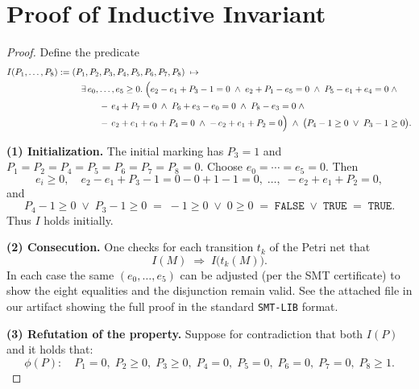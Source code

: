 
\section{Proof of Inductive Invariant}
\label{appendix:InductiveInvariantExample}


\begin{proof}
	
Define the predicate
\[
\begin{aligned}
	I(P_{1},\dots,P_{8})
	:={}&
		(P_{1},\textcolor{black}{P_{2}},\textcolor{black}{P_{3}},P_{4},P_{5},P_{6},\textcolor{black}{P_{7}},\textcolor{black}{P_{8}})
		\;\mapsto\;\\
		&\quad
		\exists\,e_{0},\dots,e_{5}\ge0.\;
		\Bigl(
		e_{2}-e_{1}+\textcolor{black}{P_{3}}-1=0\;\land\;
		e_{2}+P_{1}-e_{5}=0\;\land\;
		P_{5}-e_{1}+e_{4}=0\;\land\\
		&\qquad\quad
		-\,e_{4}+\textcolor{black}{P_{7}}=0\;\land\;
		P_{6}+e_{3}-e_{0}=0\;\land\;
		\textcolor{black}{P_{8}}-e_{3}=0\;\land\\
		&\qquad\quad
		-\,e_{2}+e_{1}+e_{0}+P_{4}=0\;\land\;
		-\,e_{2}+e_{1}+\textcolor{black}{P_{2}}=0
		\Bigr)
		\;\land\;
		\bigl(P_{4}-1\ge0\;\lor\;\textcolor{black}{P_{3}}-1\ge0\bigr).
	\end{aligned}
	\]
	
	
	\medskip\noindent
	\textbf{(1) Initialization.}
	The initial marking has $P_{3}=1$ and $P_{1}=P_{2}=P_{4}=P_{5}=P_{6}=P_{7}=P_{8}=0$.
	Choose $e_{0}=\cdots=e_{5}=0$.  Then
	\[
	e_{i}\ge0,\quad
	e_{2}-e_{1}+P_{3}-1=0-0+1-1=0,\;\dots,\;-e_{2}+e_{1}+P_{2}=0,
	\]
	and 
	\[
	P_{4}-1\ge0\;\lor\;P_{3}-1\ge0
	\;=\;-1\ge0\;\lor\;0\ge0
	\;=\;\texttt{FALSE}\;\lor\;\texttt{TRUE}
	\;=\;\texttt{TRUE}.
	\]
	Thus $I$ holds initially.
	
	\medskip\noindent
	\textbf{(2) Consecution.}
	One checks for each transition $t_{k}$ of the Petri net that
	\[
	I(M)\;\Longrightarrow\;I\bigl(t_{k}(M)\bigr).
	\]
	In each case the same $(e_{0},\dots,e_{5})$ can be adjusted (per the SMT certificate) to show the eight equalities and the disjunction remain valid. See the attached file in our artifact showing the full proof in the standard \texttt{SMT-LIB} format.
	
	\medskip\noindent
	\textbf{(3) Refutation of the property.}
	Suppose for contradiction that both $I(P)$ and it holds that:
	\[
	\phi(P):\quad
	P_{1}=0,\;
	P_{2}\ge0,\;
	P_{3}\ge0,\;
	P_{4}=0,\;
	P_{5}=0,\;
	P_{6}=0,\;
	P_{7}=0,\;
	P_{8}\ge1.
	\] 
	

\end{proof}
